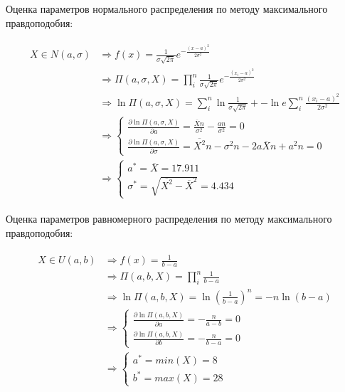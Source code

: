 \documentclass[12pt, a4paper]{article}
\begin{document}
\noindent Оценка параметров нормального распределения по методу максимального правдоподобия:

\begin{align*}
  \begin{split}
    X \in N(a, \sigma)
      &\Rightarrow
      f(x) = \frac{1}{\sigma\sqrt{2\pi}}e^{-\frac{(x-a)^2}{2\sigma^2}} \\
      &\Rightarrow
      \Pi(a, \sigma, X) = \prod_i^n \frac{1}{\sigma\sqrt{2\pi}}e^{-\frac{(x_i-a)^2}{2\sigma^2}} \\
      &\Rightarrow
      \ln\Pi(a, \sigma, X) = \sum_i^n \ln\frac{1}{\sigma\sqrt{2\pi}} 
        + -\ln{e}\sum_i^n \frac{(x_i-a)^2}{2\sigma^2} \\
      &\Rightarrow
      \begin{cases} 
        \frac{\partial{\ln\Pi(a, \sigma, X)}}{\partial{a}}
          = \frac{\overline{X}n}{\sigma^2} - \frac{an}{\sigma^2} = 0 \\
        \frac{\partial{\ln\Pi(a, \sigma, X)}}{\partial{\sigma}}
          = \overline{X^2}n - \sigma^2n - 2a\overline{X}n + a^2n = 0
      \end{cases} \\
      &\Rightarrow
      \begin{cases} 
        a^* = \overline{X} = 17.911 \\
        \sigma^* = \sqrt{\overline{X^2} - \overline{X}^2} = 4.434
      \end{cases}
  \end{split}
\end{align*}
\vspace{5mm}

\newpage

\noindent Оценка параметров равномерного распределения по методу максимального правдоподобия:

\begin{align*}
  \begin{split}
    X \in U(a, b)
      &\Rightarrow
      f(x) = \frac{1}{b - a} \\
      &\Rightarrow
      \Pi(a, b, X) = \prod_i^n \frac{1}{b - a} \\
      &\Rightarrow
      \ln\Pi(a, b, X) = \ln\left( \frac{1}{b - a} \right)^n
        = -n \ln(b - a)\\
      &\Rightarrow
      \begin{cases} 
        \frac{\partial{\ln\Pi(a, b, X)}}{\partial{a}}
          = -\frac{n}{a - b} = 0 \\
        \frac{\partial{\ln\Pi(a, b, X)}}{\partial{b}}
          = -\frac{n}{b - a} = 0
      \end{cases} \\
      &\Rightarrow
      \begin{cases} 
        a^* = min(X) = 8 \\
        b^* = max(X) = 28
      \end{cases}
  \end{split}
\end{align*}
\vspace{5mm}
\end{document}
